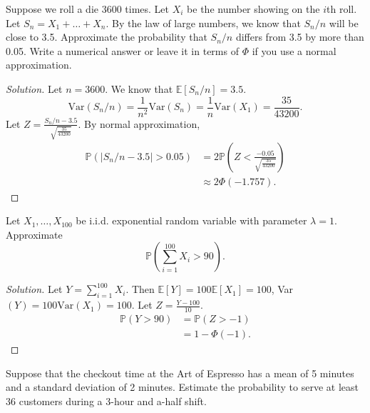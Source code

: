 \documentclass[addpoints, 11pt]{exam}
\newcommand*{\prob}{\mathds{P}}
\newcommand*{\E}{\mathds{E}}
\newenvironment{question}[1]{\smallskip\noindent\color{crimson}{\bf Question #1.}}{}
\begin{document}
\newpage

\begin{question}{2}
    Suppose we roll a die 3600 times. Let $X_i$ be the number showing on the $i$th roll. Let $S_n = X_1+ \dots + X_n$. By the law of large numbers, we know that $S_n/n$ will be close to 3.5. Approximate the probability that $S_n/n$ differs from 3.5 by more than 0.05. Write a numerical answer or leave it in terms of $\Phi$ if you use a normal approximation.
\end{question}

\begin{proof}[Solution]
    Let $n = 3600$. We know that 
    $\E[S_n/n] = 3.5$. 
    \[
        \text{Var}(S_n/n) = \frac{1}{n^2}\text{Var}(S_n) = \frac{1}{n}\text{Var}(X_1) = \frac{35}{43200}.
    \]
    Let $Z = \frac{S_n/n - 3.5}{\sqrt{\frac{35}{43200}}}$. By normal approximation,
    \begin{align*}
        \prob(|S_n/n - 3.5| > 0.05)
        &= 2\prob\left(Z < \frac{-0.05}{\sqrt{\frac{35}{43200}}}\right) \\
        &\approx 2\Phi(-1.757).
    \end{align*}
\end{proof}

\newpage

\begin{question}{3}
    Let $X_1, \dots , X_{100}$ be i.i.d. exponential random variable with parameter $\lambda = 1$. Approximate
    \[
        \prob\left(\sum_{i=1}^{100} X_i > 90 \right).
    \]
\end{question}

\begin{proof}[Solution]
    Let $Y = \sum_{i=1}^{100} X_i$. Then $\E[Y] = 100\E[X_1] = 100$, Var$(Y) = 100\text{Var}(X_1) = 100$. Let $Z = \frac{Y - 100}{10}$.
    \begin{align*}
        \prob(Y > 90)
        &= \prob\left(Z > -1 \right) \\
        &= 1 - \Phi(-1).
    \end{align*}
\end{proof}

\newpage

\begin{question}{4}
    Suppose that the checkout time at the Art of Espresso has a mean of 5 minutes and a standard deviation of 2 minutes. Estimate the probability to serve at least 36 customers during a 3-hour and a-half shift.
\end{question}
\end{document}
